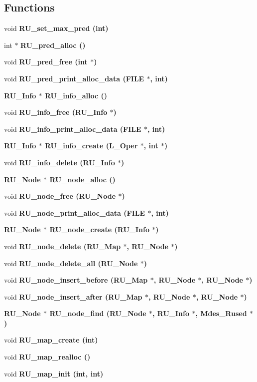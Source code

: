 \subsection*{Functions}
\begin{CompactItemize}
\item 
void \bf{RU\_\-set\_\-max\_\-pred} (int)
\item 
int $\ast$ \bf{RU\_\-pred\_\-alloc} ()
\item 
void \bf{RU\_\-pred\_\-free} (int $\ast$)
\item 
void \bf{RU\_\-pred\_\-print\_\-alloc\_\-data} (FILE $\ast$, int)
\item 
\bf{RU\_\-Info} $\ast$ \bf{RU\_\-info\_\-alloc} ()
\item 
void \bf{RU\_\-info\_\-free} (\bf{RU\_\-Info} $\ast$)
\item 
void \bf{RU\_\-info\_\-print\_\-alloc\_\-data} (FILE $\ast$, int)
\item 
\bf{RU\_\-Info} $\ast$ \bf{RU\_\-info\_\-create} (L\_\-Oper $\ast$, int $\ast$)
\item 
void \bf{RU\_\-info\_\-delete} (\bf{RU\_\-Info} $\ast$)
\item 
\bf{RU\_\-Node} $\ast$ \bf{RU\_\-node\_\-alloc} ()
\item 
void \bf{RU\_\-node\_\-free} (\bf{RU\_\-Node} $\ast$)
\item 
void \bf{RU\_\-node\_\-print\_\-alloc\_\-data} (FILE $\ast$, int)
\item 
\bf{RU\_\-Node} $\ast$ \bf{RU\_\-node\_\-create} (\bf{RU\_\-Info} $\ast$)
\item 
void \bf{RU\_\-node\_\-delete} (\bf{RU\_\-Map} $\ast$, \bf{RU\_\-Node} $\ast$)
\item 
void \bf{RU\_\-node\_\-delete\_\-all} (\bf{RU\_\-Node} $\ast$)
\item 
void \bf{RU\_\-node\_\-insert\_\-before} (\bf{RU\_\-Map} $\ast$, \bf{RU\_\-Node} $\ast$, \bf{RU\_\-Node} $\ast$)
\item 
void \bf{RU\_\-node\_\-insert\_\-after} (\bf{RU\_\-Map} $\ast$, \bf{RU\_\-Node} $\ast$, \bf{RU\_\-Node} $\ast$)
\item 
\bf{RU\_\-Node} $\ast$ \bf{RU\_\-node\_\-find} (\bf{RU\_\-Node} $\ast$, \bf{RU\_\-Info} $\ast$, Mdes\_\-Rused $\ast$)
\item 
void \bf{RU\_\-map\_\-create} (int)
\item 
void \bf{RU\_\-map\_\-realloc} ()
\item 
void \bf{RU\_\-map\_\-init} (int, int)
\item 

\end{CompactItemize}
